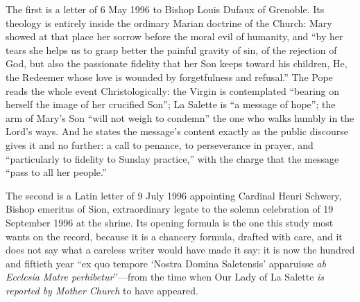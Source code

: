 The first is a letter of 6 May 1996 to Bishop Louis Dufaux of
Grenoble. Its theology is entirely inside the ordinary Marian
doctrine of the Church: Mary showed at that place her sorrow before
the moral evil of humanity, and ``by her tears she helps us to grasp
better the painful gravity of sin, of the rejection of God, but also
the passionate fidelity that her Son keeps toward his children, He,
the Redeemer whose love is wounded by forgetfulness and refusal.''
The Pope reads the whole event Christologically: the Virgin is
contemplated ``bearing on herself the image of her crucified Son'';
La Salette is ``a message of hope''; the arm of Mary's Son ``will not
weigh to condemn'' the one who walks humbly in the Lord's ways. And
he states the message's content exactly as the public discourse
gives it and no further: a call to penance, to perseverance in
prayer, and ``particularly to fidelity to Sunday practice,'' with the
charge that the message ``pass to all her people.''

The second is a Latin letter of 9 July 1996 appointing Cardinal
Henri Schwery, Bishop emeritus of Sion, extraordinary legate to the
solemn celebration of 19 September 1996 at the shrine. Its opening
formula is the one this study most wants on the record, because it
is a chancery formula, drafted with care, and it does not say what a
careless writer would have made it say: it is now the hundred and
fiftieth year ``ex quo tempore `Nostra Domina Saletensis' apparuisse
\emph{ab Ecclesia Matre perhibetur}''---from the time when Our Lady
of La Salette \emph{is reported by Mother Church} to have
appeared.

